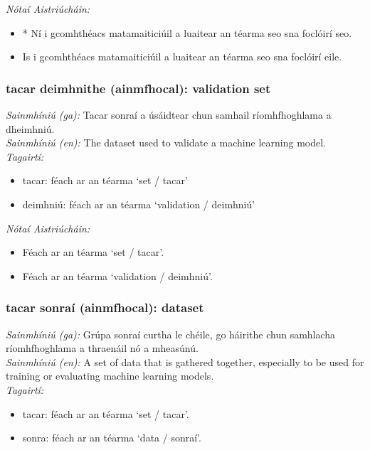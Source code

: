 \documentclass{article}
\begin{document}
 \noindent \textit{Nótaí Aistriúcháin:}
\begin{itemize}
	\item * Ní i gcomhthéacs matamaiticiúil a luaitear an téarma seo sna foclóirí seo.
	\item Is i gcomhthéacs matamaiticiúil a luaitear an téarma seo sna foclóirí eile.
\end{itemize}


\subsubsection*{tacar deimhnithe (ainmfhocal): validation set}
 \noindent \textit{Sainmhíniú (ga):} Tacar sonraí a úsáidtear chun samhail ríomhfhoghlama a dheimhniú.
\\
 \noindent \textit{Sainmhíniú (en):} The dataset used to validate a machine learning model.
\\
 \noindent \textit{Tagairtí:}
\begin{itemize}
	\item tacar: féach ar an téarma `set / tacar'
	\item deimhniú: féach ar an téarma `validation / deimhniú'
\end{itemize}

 \noindent \textit{Nótaí Aistriúcháin:}
\begin{itemize}
	\item Féach ar an téarma `set / tacar'.
	\item Féach ar an téarma `validation / deimhniú'.
\end{itemize}


\subsubsection*{tacar sonraí (ainmfhocal): dataset}
 \noindent \textit{Sainmhíniú (ga):} Grúpa sonraí curtha le chéile, go háirithe chun samhlacha ríomhfhoghlama a thraenáil nó a mheasúnú.
\\
 \noindent \textit{Sainmhíniú (en):} A set of data that is gathered together, especially to be used for training or evaluating machine learning models.
\\
 \noindent \textit{Tagairtí:}
\begin{itemize}
	\item tacar: féach ar an téarma `set / tacar'.
	\item sonra: féach ar an téarma `data / sonraí'.
\end{itemize}
\end{document}
